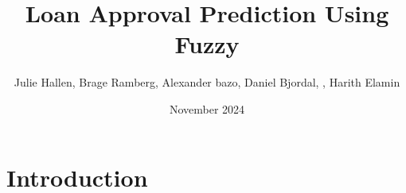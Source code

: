 \documentclass{article}
\title{Loan Approval Prediction Using Fuzzy}
\author{Julie Hallen, Brage Ramberg, Alexander bazo, Daniel Bjordal, , Harith Elamin}
\date{November 2024}
\begin{document}
\maketitle

\section{Introduction}

\end{document}
